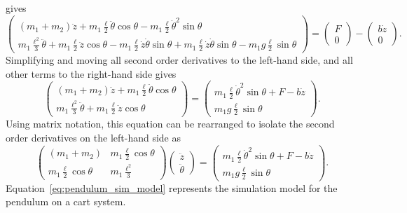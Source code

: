 gives
\[
\begin{pmatrix}
(m_1+m_2)\ddot{z} + m_1 \frac{\ell}{2} \ddot{\theta}\cos\theta - m_1 \frac{\ell}{2} \dot{\theta}^2\sin\theta \\
m_1 \frac{\ell^2}{3} \ddot{\theta} + m_1 \frac{\ell}{2} \ddot{z}\cos\theta - m_1 \frac{\ell}{2} \dot{z}\dot{\theta}\sin\theta + m_1\frac{\ell}{2}\dot{z}\dot{\theta}\sin\theta - m_1 g \frac{\ell}{2} \sin\theta
\end{pmatrix}
 = \begin{pmatrix} F \\ 0 \end{pmatrix}-\begin{pmatrix} b\dot{z} \\ 0 \end{pmatrix}.
\]
Simplifying and moving all second order derivatives to the left-hand side, and all other terms to the right-hand side gives
\[
\begin{pmatrix}
(m_1+m_2)\ddot{z} + m_1 \frac{\ell}{2} \ddot{\theta}\cos\theta  \\
m_1 \frac{\ell^2}{3} \ddot{\theta} + m_1 \frac{\ell}{2} \ddot{z}\cos\theta   
\end{pmatrix}
= \begin{pmatrix}  m_1 \frac{\ell}{2} \dot{\theta}^2\sin\theta + F -b\dot{z} \\ m_1 g \frac{\ell}{2} \sin\theta \end{pmatrix}.
\]
Using matrix notation, this equation can be rearranged to isolate the second order derivatives on the left-hand side as
\begin{equation}\label{eq:pendulum_sim_model}
\begin{pmatrix}
(m_1+m_2) & m_1 \frac{\ell}{2} \cos\theta \\ 
m_1 \frac{\ell}{2} \cos\theta & m_1 \frac{\ell^2}{3}
\end{pmatrix} \begin{pmatrix}\ddot{z} \\ \ddot{\theta} \end{pmatrix}
= \begin{pmatrix}  m_1 \frac{\ell}{2} \dot{\theta}^2\sin\theta + F -b\dot{z} \\ m_1 g \frac{\ell}{2} \sin\theta \end{pmatrix}.
\end{equation}
Equation~\eqref{eq:pendulum_sim_model} represents the simulation model for the pendulum on a cart system.

